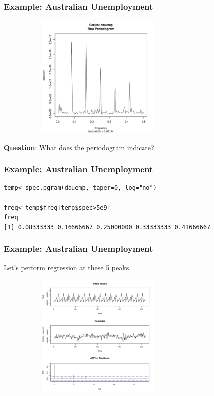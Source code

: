 \documentclass[%
xcolor=pdftex]{beamer}
\begin{document}
\begin{frame}
\frametitle{Example: Australian Unemployment}

\includegraphics[width=100mm, height=60mm]{pics/perioddauemp.pdf}

\textbf{Question}: What does the periodogram indicate?

\end{frame}

\begin{frame}[fragile]
\frametitle{Example: Australian Unemployment}

\begin{verbatim}
temp<-spec.pgram(dauemp, taper=0, log="no")

freq<-temp$freq[temp$spec>5e9]
freq
[1] 0.08333333 0.16666667 0.25000000 0.33333333 0.41666667
\end{verbatim}

\end{frame}


\begin{frame}
\frametitle{Example: Australian Unemployment}

Let's perform regression at these 5 peaks.

\includegraphics[width=100mm, height=60mm]{pics/fitteddauemp.pdf}

\end{frame}
\end{document}

